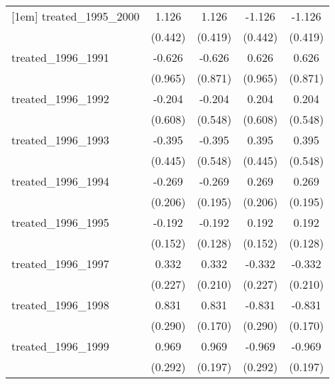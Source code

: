 {\begin{tabular}{l*{4}{c}}
[1em]
treated\_1995\_2000&       1.126\sym{*}  &       1.126\sym{**} &      -1.126\sym{*}  &      -1.126\sym{**} \\
            &     (0.442)         &     (0.419)         &     (0.442)         &     (0.419)         \\
[1em]
treated\_1996\_1991&      -0.626         &      -0.626         &       0.626         &       0.626         \\
            &     (0.965)         &     (0.871)         &     (0.965)         &     (0.871)         \\
[1em]
treated\_1996\_1992&      -0.204         &      -0.204         &       0.204         &       0.204         \\
            &     (0.608)         &     (0.548)         &     (0.608)         &     (0.548)         \\
[1em]
treated\_1996\_1993&      -0.395         &      -0.395         &       0.395         &       0.395         \\
            &     (0.445)         &     (0.548)         &     (0.445)         &     (0.548)         \\
[1em]
treated\_1996\_1994&      -0.269         &      -0.269         &       0.269         &       0.269         \\
            &     (0.206)         &     (0.195)         &     (0.206)         &     (0.195)         \\
[1em]
treated\_1996\_1995&      -0.192         &      -0.192         &       0.192         &       0.192         \\
            &     (0.152)         &     (0.128)         &     (0.152)         &     (0.128)         \\
[1em]
treated\_1996\_1997&       0.332         &       0.332         &      -0.332         &      -0.332         \\
            &     (0.227)         &     (0.210)         &     (0.227)         &     (0.210)         \\
[1em]
treated\_1996\_1998&       0.831\sym{**} &       0.831\sym{***}&      -0.831\sym{**} &      -0.831\sym{***}\\
            &     (0.290)         &     (0.170)         &     (0.290)         &     (0.170)         \\
[1em]
treated\_1996\_1999&       0.969\sym{***}&       0.969\sym{***}&      -0.969\sym{***}&      -0.969\sym{***}\\
            &     (0.292)         &     (0.197)         &     (0.292)         &     (0.197)         \\

\end{tabular}}

